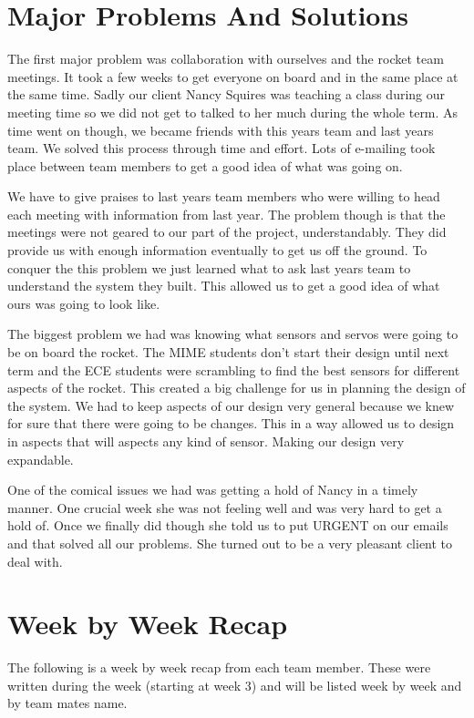 \documentclass[10pt,draftclsnofoot,onecolumn]{IEEEtran}
\begin{document}
\section{Major Problems And Solutions}
The first major problem was collaboration with ourselves and the rocket team meetings. It took a few weeks to get everyone on board and in the same place at the same time. Sadly our client Nancy Squires was teaching a class during our meeting time so we did not get to talked to her much during the whole term. As time went on though, we became friends with this years team and last years team. We solved this process through time and effort. Lots of e-mailing took place between team members to get a good idea of what was going on. \par
We have to give praises to last years team members who were willing to head each meeting with information from last year. The problem though is that the meetings were not geared to our part of the project, understandably. They did provide us with enough information eventually to get us off the ground. To conquer the this problem we just learned what to ask last years team to understand the system they built. This allowed us to get a good idea of what ours was going to look like. \par
The biggest problem we had was knowing what sensors and servos were going to be on board the rocket. The MIME students don't start their design until next term and the ECE students were scrambling to find the best sensors for different aspects of the rocket. This created a big challenge for us in planning the design of the system. We had to keep aspects of our design very general because we knew for sure that there were going to be changes. This in a way allowed us to design in aspects that will aspects any kind of sensor. Making our design very expandable. \par
One of the comical issues we had was getting a hold of Nancy in a timely manner. One crucial week she was not feeling well and was very hard to get a hold of. Once we finally did though she told us to put URGENT on our emails and that solved all our problems. She turned out to be a very pleasant client to deal with. \par

\section{Week by Week Recap}
The following is a week by week recap from each team member. These were written during the week (starting at week 3) and will be listed week by week and by team mates name.  \par
\end{document}
